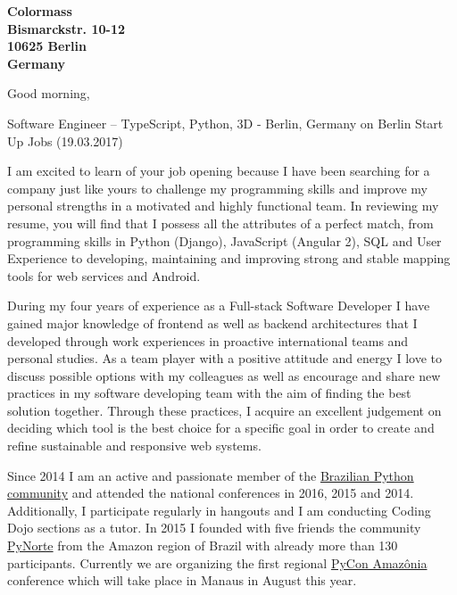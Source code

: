 \documentclass[a4paper]{joaosoares-letter}
\begin{document}
\longindentation=0pt


\begin{letter}{\bfseries Colormass\\Bismarckstr. 10-12\\10625 Berlin\\Germany}


\date{Belém, \today}

\opening{Good morning,}{Software Engineer – TypeScript, Python, 3D - Berlin, Germany on Berlin Start Up Jobs (19.03.2017)}

I am excited to learn of your job opening because I have been searching for a company just like yours to challenge my programming skills and improve my personal strengths in a motivated and highly functional team. In reviewing my resume, you will find that I possess all the attributes of a perfect match, from programming skills in Python (Django), JavaScript (Angular 2), SQL and User Experience to developing, maintaining and improving strong and stable mapping tools for web services and Android.

During my four years of experience as a Full-stack Software Developer I have gained major knowledge of frontend as well as backend architectures that I developed through work experiences in proactive international teams and personal studies. As a team player with a positive attitude and energy I love to discuss possible options with my colleagues as well as encourage and share new practices in my software developing team with the aim of finding the best solution together. Through these practices, I acquire an excellent judgement on deciding which tool is the best choice for a specific goal in order to create and refine sustainable and responsive web systems.

Since 2014 I am an active and passionate member of the \href{http://python.org.br}{Brazilian Python community} and attended the national conferences in 2016, 2015 and 2014. Additionally, I participate regularly in hangouts and I am conducting Coding Dojo sections as a tutor. In 2015 I founded with five friends the community \href{http://pynorte.python.org.br}{PyNorte} from the Amazon region of Brazil with already more than 130 participants. Currently we are organizing the first regional \href{http://amazonia.python.org.br/}{PyCon Amazônia} conference which will take place in Manaus in August this year.


\end{letter}
\end{document}
